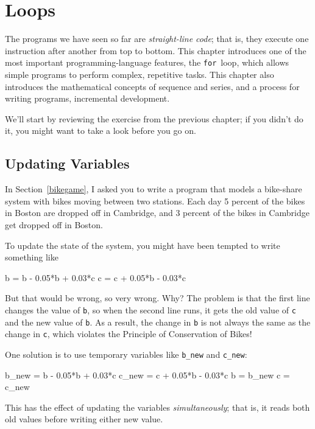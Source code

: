 
\chapter{Loops}
\label{loops}


The programs we have seen so far are \emph{straight-line code}; that is, they execute one instruction after another from top to bottom.
This chapter introduces one of the most important programming-language features, the \lstinline{for}~loop, which allows simple programs to perform complex, repetitive tasks. This chapter also introduces the mathematical concepts of sequence and series, and a process for writing programs, incremental development. 

We'll start by reviewing the exercise from the previous chapter; if you didn't do it, you might want to take a look before you go on.

\section{Updating Variables}

In Section~\ref{bikegame}, I asked you to write a program that models a bike-share system with bikes moving between two stations.
Each day 5 percent of the bikes in Boston are dropped off in Cambridge, and 3 percent of the bikes
in Cambridge get dropped off in Boston.

To update the state of the system, you might have been tempted to write something
like


\begin{code}
b = b - 0.05*b + 0.03*c
c = c + 0.05*b - 0.03*c
\end{code}

But that would be wrong, so very wrong.  Why?  The problem is that
the first line changes the value of \lstinline{b}, so when the second line
runs, it gets the old value of \lstinline{c} and the new value of \lstinline{b}.
As a result, the change in \lstinline{b} is not always the same as the
change in \lstinline{c}, which violates the Principle of Conservation
of Bikes!

One solution is to use temporary variables like \lstinline{b_new} and \lstinline{c_new}:

\begin{code}
b_new = b - 0.05*b + 0.03*c
c_new = c + 0.05*b - 0.03*c
b = b_new
c = c_new
\end{code}

This has the effect of updating the variables \emph{simultaneously}; that
is, it reads both old values before writing either new value.

